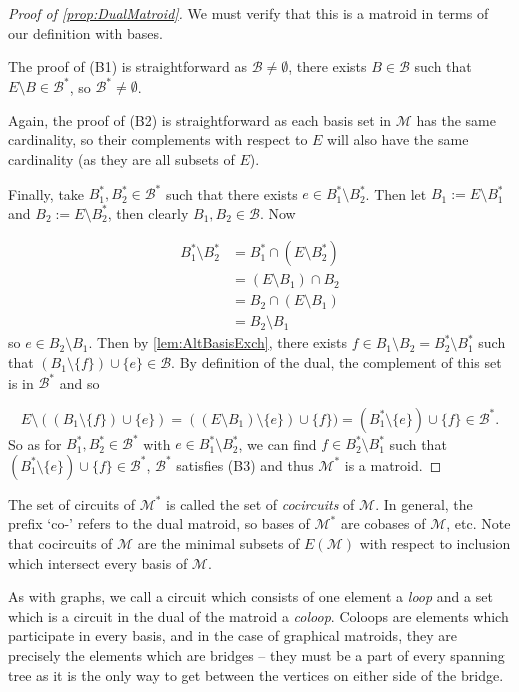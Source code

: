\documentclass[12pt]{report}
\theoremstyle{definition}
\def\calB{\mathcal B}
\def\calM{\mathcal M}
\theoremstyle{upright}
\begin{document}
\begin{proof}[Proof of \cref{prop:DualMatroid}]

    We must verify that this is a matroid in terms of our definition with bases.

    The proof of (B1) is straightforward as $\calB\neq\emptyset$, there exists $B\in\calB$ such that $E\setminus B\in\calB^\ast$, so $\calB^\ast\neq\emptyset$.

    Again, the proof of (B2) is straightforward as each basis set in $\calM$ has the same cardinality, so their complements with respect to $E$ will also have the same cardinality (as they are all subsets of $E$).

    Finally, take $B_1^\ast, B_2^\ast\in\calB^\ast$ such that there exists $e\in B_1^\ast\setminus B_2^\ast$.
    Then let $B_1:=E\setminus B_1^\ast$ and $B_2:=E\setminus B_2^\ast$, then clearly $B_1, B_2\in\calB$.
    Now

    \[\begin{aligned}
        B_1^\ast\setminus B_2^\ast&=B_1^\ast\cap(E\setminus B_2^\ast)\\
        &=(E\setminus B_1)\cap B_2\\
        &=B_2\cap(E\setminus B_1)\\
        &=B_2\setminus B_1
    \end{aligned}\]
    so $e\in B_2\setminus B_1$.
    Then by \cref{lem:AltBasisExch}, there exists $f\in B_1\setminus B_2=B_2^\ast\setminus B_1^\ast$ such that $(B_1\setminus\{f\})\cup\{e\}\in\calB$.
    By definition of the dual, the complement of this set is in $\calB^\ast$ and so

    \[E\setminus((B_1\setminus\{f\})\cup\{e\})=((E\setminus B_1)\setminus\{e\})\cup\{f\})=(B_1^\ast\setminus\{e\})\cup\{f\}\in\calB^*.\]
    So as for $B_1^\ast, B_2^\ast\in\calB^\ast$ with $e\in B_1^\ast\setminus B_2^\ast$, we can find $f\in B_2^\ast\setminus B_1^\ast$ such that $(B_1^\ast\setminus\{e\})\cup\{f\}\in\calB^*$, $\calB^\ast$ satisfies (B3) and thus $\calM^\ast$ is a matroid.

\end{proof}

The set of circuits of $\calM^*$ is called the set of \textit{cocircuits} of $\calM$.
In general, the prefix `co-' refers to the dual matroid, so bases of $\calM^*$ are cobases of $\calM$, etc.
Note that cocircuits of $\calM$ are the minimal subsets of $E(\calM)$ with respect to inclusion which intersect every basis of $\calM$.

As with graphs, we call a circuit which consists of one element a \textit{loop} and a set which is a circuit in the dual of the matroid a \textit{coloop}.
Coloops are elements which participate in every basis, and in the case of graphical matroids, they are precisely the elements which are bridges -- they must be a part of every spanning tree as it is the only way to get between the vertices on either side of the bridge.
\end{document}
